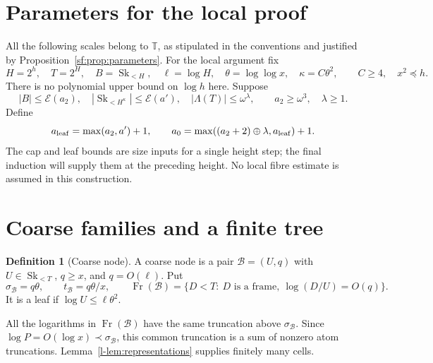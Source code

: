 \documentclass[11pt]{article}
\theoremstyle{definition}
\newtheorem{definition}[theorem]{Definition}
\theoremstyle{remark}
\newcommand{\Sk}{\operatorname{Sk}}
\newcommand{\T}{\mathbb T}
\newcommand{\hs}{\mathbin{\oplus}}
\newcommand{\EE}{\mathcal E}
\newcommand{\Fr}{\operatorname{Fr}}
\newcommand{\calB}{\mathcal B}
\numberwithin{equation}{section}
\begin{document}
\section{Parameters for the local proof}\label{local-setup}
All the following scales belong to $\T$, as stipulated in the
conventions and justified by Proposition~\ref{sf:prop:parameters}.
For the local argument fix
\begin{equation}
 H=2^h,\quad T=2^H,\quad B=\Sk_{<H},\quad
 \ell=\log H,\quad \theta=\log\log x,\quad
 \kappa=C\theta^2,\qquad C\ge4,\quad x^2\preceq h.
 \label{local-cap}
\end{equation}
There is no polynomial upper bound on $\log h$ here. Suppose
\begin{equation}
 |B|\le\EE(a_2),\quad |\Sk_{<H^\kappa}|\le\EE(a'),\quad
 |\Lambda(T)|\le\omega^\lambda,\qquad a_2\ge\omega^3,\quad\lambda\ge1.
 \label{local-sizes}
\end{equation}
Define
\begin{equation}
 a_{\rm leaf}=\max(a_2,a')+1,\qquad
 a_0=\max((a_2+2)\hs\lambda,a_{\rm leaf})+1.
 \label{local-a0}
\end{equation}
The cap and leaf bounds are size inputs for a single height
step; the final induction will supply them at the preceding height.
No local fibre estimate is assumed in this construction.


\section{Coarse families and a finite tree}

\begin{definition}[Coarse node]\label{l-def:coarse}
A coarse node is a pair $\calB=(U,q)$ with
$U\in\Sk_{<T}$, $q\ge x$, and $q=O(\ell)$.  Put
\begin{equation}
 \sigma_{\calB}=q\theta,\qquad t_{\calB}=q\theta/x,\qquad
 \Fr(\calB)=\{D<T:\ D\text{ is a frame},\
                                  \log(D/U)=O(q)\}.
 \label{l-eq-4.1}
\end{equation}
It is a leaf if $\log U\le\ell\theta^2$.
\end{definition}

All the logarithms in $\Fr(\calB)$ have the same truncation above
$\sigma_{\calB}$.  Since $\log P=O(\log x)\prec\sigma_{\calB}$,
this common truncation is a sum of nonzero atom truncations.
Lemma~\ref{l-lem:representations} supplies finitely many cells.
\end{document}
